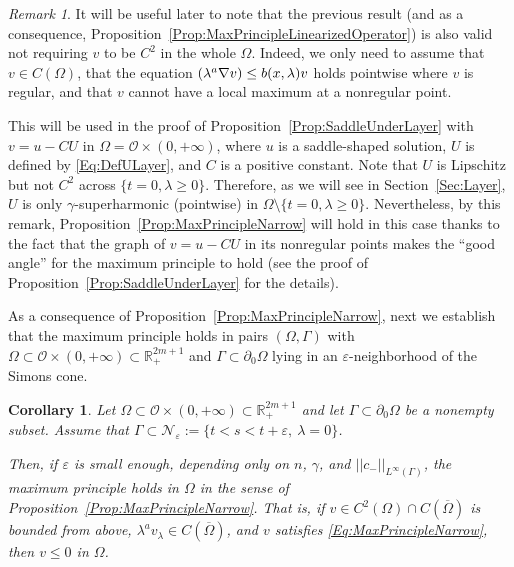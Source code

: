 \documentclass[12pt,reqno]{amsart}
\newtheorem{corollary}[theorem]{Corollary}
\theoremstyle{definition}
\theoremstyle{remark}
\newtheorem{remark}[theorem]{Remark}
\newcommand{\con}[1]{\mathbb{#1}}
\newcommand{\R}{\con{R}} %
\newcommand{\ncal}{\mathcal{N}}
\newcommand{\ocal}{\mathcal{O}}
\newcommand{\norm}[1]{\left | \left |{#1} \right | \right |}
\newcommand{\s}{\gamma}
\let\div\relax
\DeclareMathOperator{\div}{div}
\numberwithin{equation}{section}
\begin{document}
\begin{remark}
	\label{Remark:WeakMPNarrow}
	It will be useful later to note that the previous result (and as a consequence, Proposition~\ref{Prop:MaxPrincipleLinearizedOperator}) is also valid not requiring $v$ to be $C^2$ in the whole $\Omega$. Indeed, we only need to assume that $v\in C(\Omega)$, that the equation $\div (\lambda^a \nabla v) \leq b(x,\lambda)v$ holds pointwise where $v$ is regular, and that $v$ cannot have a local maximum at a nonregular point.
	
	This will be used in the proof of Proposition~\ref{Prop:SaddleUnderLayer} with $v = u- CU$ in $\Omega = \ocal \times (0,+\infty)$, where $u$ is a saddle-shaped solution, $U$ is defined by \eqref{Eq:DefULayer}, and $C$ is a positive constant. Note that $U$ is Lipschitz but not $C^2$ across $\{t=0, \lambda\geq 0\}$. Therefore, as we will see in Section~\ref{Sec:Layer}, $U$ is only $\s$-superharmonic (pointwise) in $\Omega \setminus \{t=0, \lambda\geq 0\}$. Nevertheless, by this remark, Proposition~\ref{Prop:MaxPrincipleNarrow} will hold in this case thanks to the fact that the graph of $v = u-CU$ in its nonregular points makes the ``good angle'' for the maximum principle to hold (see the proof of Proposition~\ref{Prop:SaddleUnderLayer} for the details).
\end{remark}

As a consequence of Proposition~\ref{Prop:MaxPrincipleNarrow}, next we establish that the maximum principle holds in pairs $(\Omega, \Gamma)$ with $ \Omega \subset \ocal \times (0, +\infty) \subset \R^{2m+1}_+$ and $\Gamma \subset \partial_0  \Omega$ lying in an $\varepsilon$-neighborhood of the Simons cone.

\begin{corollary}
\label{Cor:MaxPrincipleNarrowSaddle}
Let $\Omega\subset \ocal \times (0, +\infty) \subset \R^{2m + 1}_+$ and let $\Gamma \subset \partial_0 \Omega$ be a nonempty subset. Assume that $\Gamma \subset \ncal_\varepsilon := \{t < s < t+\varepsilon, \ \lambda= 0 \}$. 

Then, if $\varepsilon$ is small enough, depending only on $n$, $\s$, and $\norm{c_-}_{L^\infty(\Gamma)}$, the maximum principle holds in $\Omega$ in the sense of Proposition~\ref{Prop:MaxPrincipleNarrow}. That is, if $v \in C^2 (\Omega)\cap C(\overline{\Omega})$ is bounded from above, $\lambda^a v_\lambda \in C (\overline{\Omega})$, and $v$ satisfies \eqref{Eq:MaxPrincipleNarrow}, then $v\leq 0$ in $\Omega$.
\end{corollary}
\end{document}
